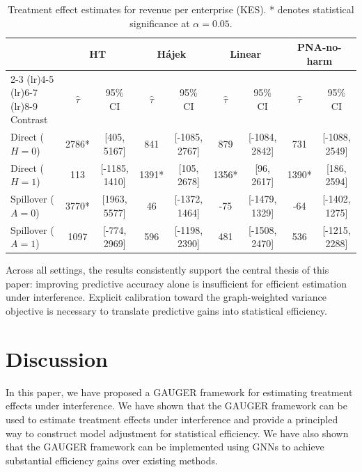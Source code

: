 \documentclass{article}
\theoremstyle{plain}
\theoremstyle{definition}
\theoremstyle{remark}
\begin{document}
\begin{table}[htbp]
    \centering
    \caption{Treatment effect estimates for revenue per enterprise (KES). * denotes statistical significance at $\alpha=0.05$.}
    \label{tab:revenue_results}
    \footnotesize
    \begin{tabular}{l cc cc cc cc}
        \toprule
        & \multicolumn{2}{c}{HT} & \multicolumn{2}{c}{H\'{a}jek} & \multicolumn{2}{c}{Linear} & \multicolumn{2}{c}{PNA-no-harm} \\
        \cmidrule(lr){2-3} \cmidrule(lr){4-5} \cmidrule(lr){6-7} \cmidrule(lr){8-9}
        Contrast & $\hat\tau$ & 95\% CI & $\hat\tau$ & 95\% CI & $\hat\tau$ & 95\% CI & $\hat\tau$ & 95\% CI \\
        \midrule
        Direct ($H=0$) & 2786* & [405, 5167] & 841 & [-1085, 2767] & 879 & [-1084, 2842] & 731 & [-1088, 2549] \\
        Direct ($H=1$) & 113 & [-1185, 1410] & 1391* & [105, 2678] & 1356* & [96, 2617] & 1390* & [186, 2594] \\
        Spillover ($A=0$) & 3770* & [1963, 5577] & 46 & [-1372, 1464] & -75 & [-1479, 1329] & -64 & [-1402, 1275] \\
        Spillover ($A=1$) & 1097 & [-774, 2969] & 596 & [-1198, 2390] & 481 & [-1508, 2470] & 536 & [-1215, 2288] \\
        \bottomrule
    \end{tabular}
\end{table}




Across all settings, the results consistently support the central thesis of this paper: improving predictive accuracy alone is insufficient for efficient estimation under interference. Explicit calibration toward the graph-weighted variance objective is necessary to translate predictive gains into statistical efficiency.

\section{Discussion}
In this paper, we have proposed a GAUGER framework for estimating treatment effects under interference. We have shown that the GAUGER framework can be used to estimate treatment effects under interference and provide a principled way to construct model adjustment for statistical efficiency. We have also shown that the GAUGER framework can be implemented using GNNs to achieve substantial efficiency gains over existing methods.
\end{document}
